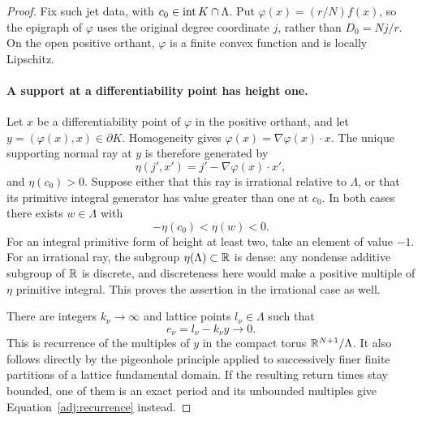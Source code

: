 \begin{proof}
Fix such jet data, with $c_0\in\operatorname{int} K\cap\Lambda$.  Put
$\varphi(x)=(r/N)f(x)$, so the epigraph of $\varphi$ uses the
original degree coordinate $j$, rather than $D_0=Nj/r$.
On the open positive orthant, $\varphi$ is a finite convex function
and is locally Lipschitz.

\paragraph{A support at a differentiability point has height one.}
Let $x$ be a differentiability point of $\varphi$ in the positive
orthant, and let $y=(\varphi(x),x)\in\partial K$.  Homogeneity
gives $\varphi(x)=\nabla\varphi(x)\cdot x$.  The unique supporting
normal ray at $y$ is therefore generated by
\[
 \eta(j',x')=j'-\nabla\varphi(x)\cdot x',
\]
and $\eta(c_0)>0$.  Suppose either that this ray is irrational
relative to $\Lambda$, or that its primitive integral generator
has value greater than one at $c_0$.  In both cases there exists
$w\in\Lambda$ with
\begin{equation}\label{adj:forbidden-strip}
 -\eta(c_0)<\eta(w)<0.
\end{equation}
For an integral primitive form of height at least two, take an
element of value $-1$.  For an irrational ray, the subgroup
$\eta(\Lambda)\subset\mathbb R$ is dense: any nondense additive subgroup
of $\mathbb R$ is discrete, and discreteness here would make a positive
multiple of $\eta$ primitive integral.  This proves the assertion
in the irrational case as well.

There are integers $k_\nu\to\infty$ and lattice points
$l_\nu\in\Lambda$ such that
\begin{equation}\label{adj:recurrence}
 e_\nu=l_\nu-k_\nu y\longrightarrow0.
\end{equation}
This is recurrence of the multiples of $y$ in the compact torus
$\mathbb R^{N+1}/\Lambda$.  It also follows directly by the pigeonhole
principle applied to successively finer finite partitions of a
lattice fundamental domain.  If the resulting return times stay
bounded, one of them is an exact period and its unbounded multiples
give Equation~\eqref{adj:recurrence} instead.


\end{proof}
